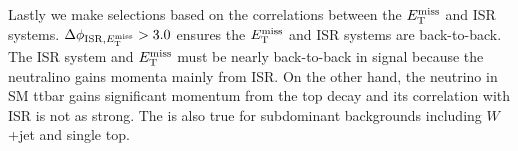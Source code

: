 

\indent Lastly we make selections based on the correlations between the $E_{\mathrm{T}}^{\mathrm{miss}}$ and ISR systems.  $\Delta\phi_{\mathrm{ISR},E_{\mathrm{T}}^{\mathrm{miss}}} > 3.0$ ensures the $E_{\mathrm{T}}^{\mathrm{miss}}$ and ISR systems are back-to-back.  The ISR system and $E_{\mathrm{T}}^{\mathrm{miss}}$ must be nearly back-to-back in signal because the neutralino gains momenta mainly from ISR.  On the other hand, the neutrino in SM ttbar gains significant momentum from the top decay and its correlation with ISR is not as strong. The is also true for subdominant backgrounds including $W$+jet and single top. \\

